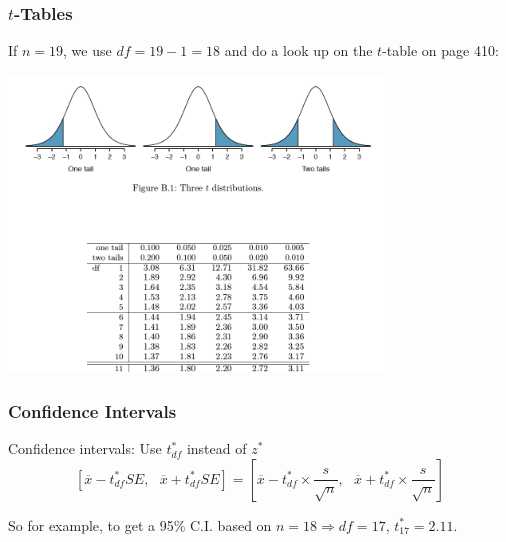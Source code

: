 \documentclass[slides]{beamer}
\newcommand{\xbar}{\overline{x}}
\begin{document}
\begin{frame}
\frametitle{$t$-Tables}
If $n=19$, we use $df=19-1=18$ and do a look up on the $t$-table on page 410:

\begin{center}
\includegraphics[width=0.75\textwidth]{t.png}
\end{center}

\end{frame}



\begin{frame}
\frametitle{Confidence Intervals}


Confidence intervals:  Use $t^*_{df}$ instead of $z^*$
\[
\left[\xbar - t_{df}^* SE, \mbox{  }\xbar + t_{df}^* SE\right] = 
\left[
\overline{x} - t_{df}^* \times\frac{s}{\sqrt n}, \mbox{  }
\overline{x} + t_{df}^* \times\frac{s}{\sqrt n}
\right]
\]


So for example, to get a 95\% C.I. based on $n=18 \Rightarrow df=17$, $t_{17}^*=2.11$.


\end{frame}
\end{document}
